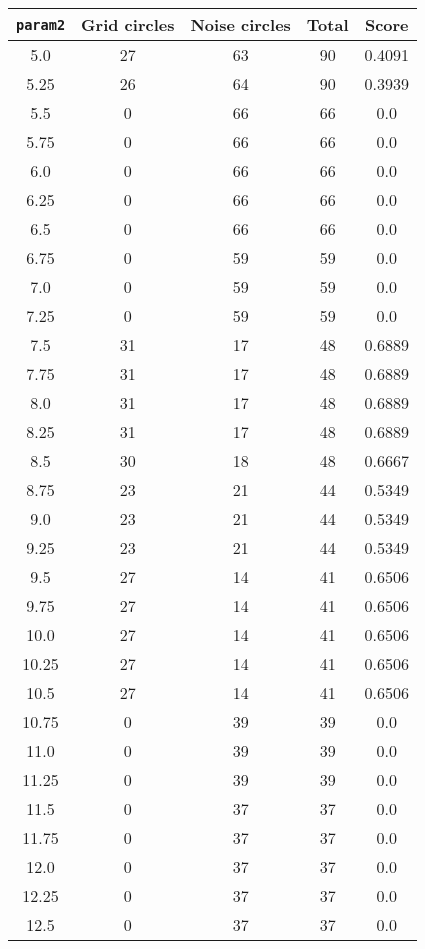 \documentclass[letterpaper, 12pt]{article}
\begin{document}
\begin{longtable}{|c|c|c|c|c|}
\hline
\textbf{\texttt{param2}} & \textbf{Grid circles} & \textbf{Noise circles} & \textbf{Total} & \textbf{Score} \\
\hline
5.0 & 27 & 63 & 90 & 0.4091 \\
\hline
5.25 & 26 & 64 & 90 & 0.3939 \\
\hline
5.5 & 0 & 66 & 66 & 0.0 \\
\hline
5.75 & 0 & 66 & 66 & 0.0 \\
\hline
6.0 & 0 & 66 & 66 & 0.0 \\
\hline
6.25 & 0 & 66 & 66 & 0.0 \\
\hline
6.5 & 0 & 66 & 66 & 0.0 \\
\hline
6.75 & 0 & 59 & 59 & 0.0 \\
\hline
7.0 & 0 & 59 & 59 & 0.0 \\
\hline
7.25 & 0 & 59 & 59 & 0.0 \\
\hline
7.5 & 31 & 17 & 48 & 0.6889 \\
\hline
7.75 & 31 & 17 & 48 & 0.6889 \\
\hline
8.0 & 31 & 17 & 48 & 0.6889 \\
\hline
8.25 & 31 & 17 & 48 & 0.6889 \\
\hline
8.5 & 30 & 18 & 48 & 0.6667 \\
\hline
8.75 & 23 & 21 & 44 & 0.5349 \\
\hline
9.0 & 23 & 21 & 44 & 0.5349 \\
\hline
9.25 & 23 & 21 & 44 & 0.5349 \\
\hline
9.5 & 27 & 14 & 41 & 0.6506 \\
\hline
9.75 & 27 & 14 & 41 & 0.6506 \\
\hline
10.0 & 27 & 14 & 41 & 0.6506 \\
\hline
10.25 & 27 & 14 & 41 & 0.6506 \\
\hline
10.5 & 27 & 14 & 41 & 0.6506 \\
\hline
10.75 & 0 & 39 & 39 & 0.0 \\
\hline
11.0 & 0 & 39 & 39 & 0.0 \\
\hline
11.25 & 0 & 39 & 39 & 0.0 \\
\hline
11.5 & 0 & 37 & 37 & 0.0 \\
\hline
11.75 & 0 & 37 & 37 & 0.0 \\
\hline
12.0 & 0 & 37 & 37 & 0.0 \\
\hline
12.25 & 0 & 37 & 37 & 0.0 \\
\hline
12.5 & 0 & 37 & 37 & 0.0 \\

\end{longtable}
\end{document}
